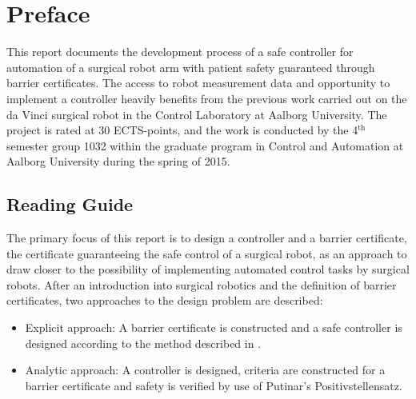 \chapter*{Preface}
\vspace*{-2mm}
This report documents the development process of a safe controller for automation of a surgical robot arm with patient safety guaranteed through barrier certificates. %
The access to robot measurement data and opportunity to implement a controller heavily benefits from the previous work carried out on the da Vinci surgical robot in the Control Laboratory at Aalborg University.
The project is rated at 30 ECTS-points, and the work is conducted by the 4$^\text{th}$ semester group 1032 within the graduate program in Control and Automation at Aalborg University during the spring of 2015.



\vspace*{-2mm}
\section*{Reading Guide}
\vspace*{-2mm}
The primary focus of this report is to design a controller and a barrier certificate, the certificate guaranteeing the safe control of a surgical robot, as an approach to draw closer to the possibility of implementing automated control tasks by surgical robots. 
After an introduction into surgical robotics and the definition of barrier certificates, two approaches to the design problem are described:
\vspace*{-3mm}
\begin{itemize}
\itemsep-1.4mm
\item Explicit approach: A barrier certificate is constructed and a safe controller is designed according to the method described in \citep{bib:org_control}.
\item Analytic approach: A controller is designed, criteria are constructed for a barrier certificate and  safety is verified by use of Putinar's Positivstellensatz.
\end{itemize}
\vspace*{-2mm}

